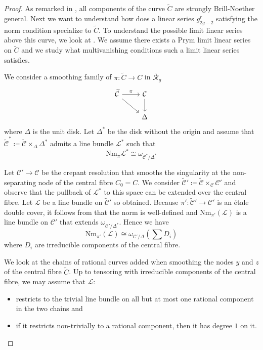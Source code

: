 \documentclass{article}
\theoremstyle{plain}
\theoremstyle{definition}
\def\rr{\overline{\mathcal{R}}}
\begin{document}
\begin{proof}
As remarked in \cite[Theorem 3.3]{Ossermandim}, all components of the curve $\widetilde{C}$ are strongly Brill-Noether general. Next we want to understand how does a linear series $g^r_{2g-2}$ satisfying the norm condition specialize to $\widetilde{C}$. To understand the possible limit linear series above this curve, we look at \cite[Section 3]{Ossermancompacttype}. We assume there exists a Prym limit linear series on $\widetilde{C}$ and we study what multivanishing conditions such a limit linear series satisfies.


We consider a smoothing family of $\pi\colon \widetilde{C} \rightarrow C$ in $\rr_g$
	\[
\begin{tikzcd}
	\widetilde{\mathcal{C}}  \arrow{r}{\pi} \arrow[swap]{dr}{} & \mathcal{C} \arrow{d}{} \\
	&  \Delta
\end{tikzcd}
\]
where $\Delta$ is the unit disk. Let $\Delta^*$ be the disk without the origin and assume that $\widetilde{\mathcal{C}}^*\coloneqq \widetilde{\mathcal{C}} \times_{\Delta}\Delta^*$ admits a line bundle $\mathcal{L}^*$ such that 
\[ \mathrm{Nm}_{\pi}\mathcal{L}^* \cong \omega_{\mathcal{C}^*/\Delta^*} \]

Let $\mathcal{C}'\rightarrow \mathcal{C}$ be the crepant resolution that smooths the singularity at the non-separating node of the central fibre $C_0 = C$. We consider $\widetilde{\mathcal{C}}'\coloneqq \widetilde{\mathcal{C}}\times_{\mathcal{C}} \mathcal{C}'$ and observe that the pullback of $\mathcal{L}^*$ to this space can be extended over the central fibre. Let $\mathcal{L}$ be a line bundle on $\widetilde{\mathcal{C}}'$ so obtained. Because $\pi' \colon \widetilde{\mathcal{C}}' \rightarrow \mathcal{C}'$ is an \'etale double cover, it follows from \cite[6.5.2]{EGA2} that the norm is well-defined and $\mathrm{Nm}_{\pi'}(\mathcal{L})$ is a line bundle on $\mathcal{C}'$ that extends $\omega_{\mathcal{C}'/\Delta^*}$. Hence we have 
\[ \mathrm{Nm}_{\pi'}(\mathcal{L}) \cong \omega_{\mathcal{C}'/\Delta}(\sum D_i)\]
where $D_i$ are irreducible components of the central fibre. 

We look at the chains of rational curves added when smoothing the nodes $y$ and $z$ of the central fibre $\widetilde{C}$. Up to tensoring with irreducible components of the central fibre, we may assume that $\mathcal{L}$: 
\begin{itemize}
	\item restricts to the trivial line bundle on all but at most one rational component in the two chains and 
	\item if it restricts non-trivially to a rational component, then it has degree $1$ on it. 
\end{itemize}


\end{proof}
\end{document}
